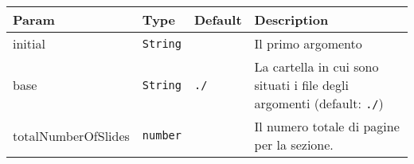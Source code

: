 \begin{tabularx}{\textwidth}{XXXX}
\toprule
\begin{minipage}[b]{0.22\columnwidth}\raggedright
Param\strut
\end{minipage} & \begin{minipage}[b]{0.22\columnwidth}\raggedright
Type\strut
\end{minipage} & \begin{minipage}[b]{0.22\columnwidth}\raggedright
Default\strut
\end{minipage} & \begin{minipage}[b]{0.22\columnwidth}\raggedright
Description\strut
\end{minipage}\tabularnewline
\midrule
\endhead
\begin{minipage}[t]{0.22\columnwidth}\raggedright
initial\strut
\end{minipage} & \begin{minipage}[t]{0.22\columnwidth}\raggedright
\texttt{String}\strut
\end{minipage} & \begin{minipage}[t]{0.22\columnwidth}\raggedright
\strut
\end{minipage} & \begin{minipage}[t]{0.22\columnwidth}\raggedright
Il primo argomento\strut
\end{minipage}\tabularnewline
\begin{minipage}[t]{0.22\columnwidth}\raggedright
base\strut
\end{minipage} & \begin{minipage}[t]{0.22\columnwidth}\raggedright
\texttt{String}\strut
\end{minipage} & \begin{minipage}[t]{0.22\columnwidth}\raggedright
\texttt{./}\strut
\end{minipage} & \begin{minipage}[t]{0.22\columnwidth}\raggedright
La cartella in cui sono situati i file degli argomenti (default:
\texttt{./})\strut
\end{minipage}\tabularnewline
\begin{minipage}[t]{0.22\columnwidth}\raggedright
totalNumberOfSlides\strut
\end{minipage} & \begin{minipage}[t]{0.22\columnwidth}\raggedright
\texttt{number}\strut
\end{minipage} & \begin{minipage}[t]{0.22\columnwidth}\raggedright
\strut
\end{minipage} & \begin{minipage}[t]{0.22\columnwidth}\raggedright
Il numero totale di pagine per la sezione.\strut
\end{minipage}\tabularnewline
\bottomrule
\end{tabularx}

